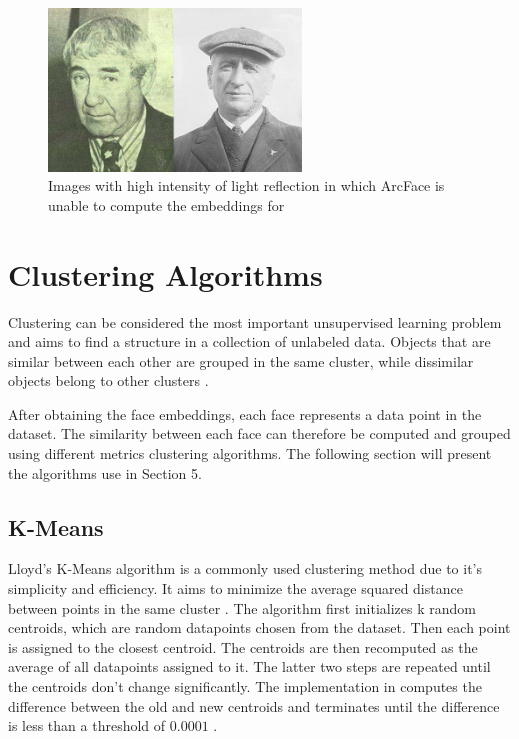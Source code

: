\documentclass[12pt,english]{article}
\begin{document}
\begin{figure}[!tbp]
 \centering
    \includegraphics[width=0.6\textwidth]{figures/ex.png}
    \caption{Images with high intensity of light reflection in which ArcFace is unable to compute the embeddings for \cite{chinapas}}
	\label{fig:arcface2}
\end{figure}

\section{Clustering Algorithms}
\label{clustering}

\quad
Clustering can be considered the most important unsupervised learning problem and aims to find a structure in a collection of unlabeled data. Objects that are similar between each other are grouped in the same cluster, while dissimilar objects belong to other clusters \cite{ncbi}.


After obtaining the face embeddings, each face represents a data point in the dataset. The similarity between each face can therefore be computed and grouped using different metrics clustering algorithms. The following section will present the algorithms use in Section 5. 

\subsection{K-Means}

\quad
Lloyd’s K-Means algorithm is a commonly used clustering method due to it's simplicity and efficiency. It aims to minimize the average squared distance between points in the same cluster \cite{kmeans}. The algorithm first initializes k random centroids, which are random datapoints chosen from the dataset. Then each point is assigned to the closest centroid. The centroids are then recomputed as the average of all datapoints assigned to it. The latter two steps are repeated until the centroids don't change significantly. The implementation in \cite{scikit-learn} computes the difference between the old and new centroids and terminates until the difference is less than a threshold of $0.0001$ \cite{kmeans}.
\end{document}
